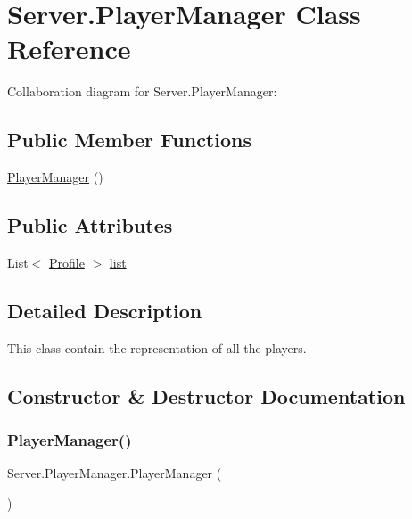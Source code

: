 \hypertarget{class_server_1_1_player_manager}{}\section{Server.\+Player\+Manager Class Reference}
\label{class_server_1_1_player_manager}


Collaboration diagram for Server.\+Player\+Manager\+:
\subsection*{Public Member Functions}
\begin{DoxyCompactItemize}
\item 
\hyperlink{class_server_1_1_player_manager_a9ca3f4facfba847a711ef313dee04304}{Player\+Manager} ()
\end{DoxyCompactItemize}
\subsection*{Public Attributes}
\begin{DoxyCompactItemize}
\item 
List$<$ \hyperlink{class_server_1_1_profile}{Profile} $>$ \hyperlink{class_server_1_1_player_manager_a3d02ffa92ec11e6b289c1fb2e60b7a9c}{list}
\end{DoxyCompactItemize}


\subsection{Detailed Description}
This class contain the representation of all the players. 

\subsection{Constructor \& Destructor Documentation}
\mbox{\label{class_server_1_1_player_manager_a9ca3f4facfba847a711ef313dee04304}} 
\subsubsection{\texorpdfstring{Player\+Manager()}{PlayerManager()}}
{\footnotesize\ttfamily Server.\+Player\+Manager.\+Player\+Manager (\begin{DoxyParamCaption}{ }\end{DoxyParamCaption})\hspace{0.3cm}{\ttfamily [inline]}}

